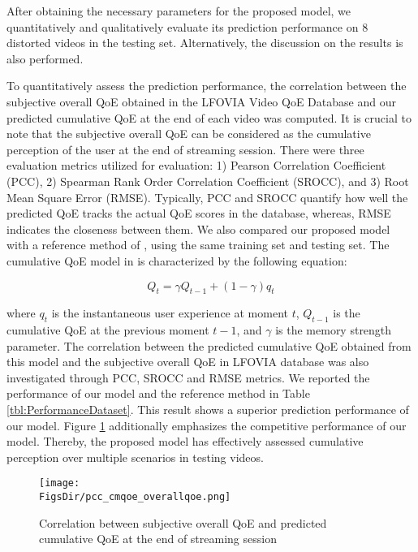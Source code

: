 After obtaining the necessary parameters for the proposed model, we quantitatively and qualitatively evaluate its prediction performance on 8 distorted videos in the testing set. Alternatively, the discussion on the results is also performed.

To quantitatively assess the prediction performance, the correlation between the subjective overall QoE obtained in the LFOVIA Video QoE Database \cite{LFOVIA} and our predicted cumulative QoE at the end of each video was computed. It is crucial to note that the subjective overall QoE can be considered as the cumulative perception of the user at the end of streaming session. There were three evaluation metrics utilized for evaluation: 1) Pearson Correlation Coefficient (PCC), 2) Spearman Rank Order Correlation Coefficient (SROCC), and 3) Root Mean Square Error (RMSE). Typically, PCC and SROCC quantify how well the predicted QoE tracks the actual QoE scores in the database, whereas, RMSE indicates the closeness between them. We also compared our proposed model with a reference method of \cite{CumulativeQoE_Assessing}, using the same training set and testing set. The cumulative QoE model in \cite{CumulativeQoE_Assessing} is characterized by the following equation: 

\begin{equation}
    Q_{t} = \gamma Q_{t-1} + (1-\gamma)q_{t}
\end{equation}

where $q_{t}$ is the instantaneous user experience at moment $t$, $Q_{t-1}$ is the cumulative QoE at the previous moment $t-1$, and $\gamma$ is the memory strength parameter. The correlation between the predicted cumulative QoE obtained from this model and the subjective overall QoE in LFOVIA database was also investigated through PCC, SROCC and RMSE metrics. We reported the performance of our model and the reference method in Table \ref{tbl:PerformanceDataset}. This result shows a superior prediction performance of our model. Figure \ref{fig:PCC_CumulativeQoe_OverallQoE} additionally emphasizes the competitive performance of our model. Thereby, the proposed model has effectively assessed cumulative perception over multiple scenarios in testing videos. 



\begin{figure}[tb]
  \centering
  \texttt{[image: \\FigsDir/pcc\_cmqoe\_overallqoe.png]}
  \caption{Correlation between subjective overall QoE and predicted cumulative QoE at the end of streaming session}
  \label{fig:PCC_CumulativeQoe_OverallQoE}
\end{figure}

